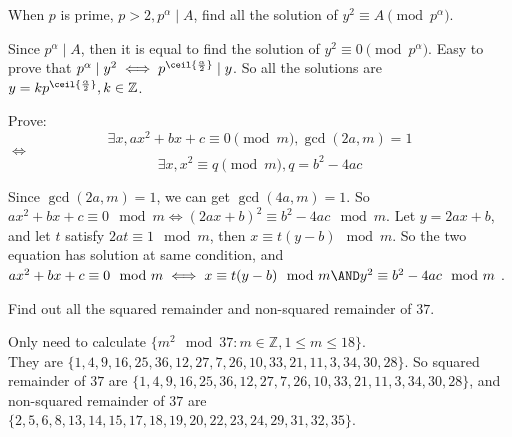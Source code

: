 \documentclass{ctexart}
\newif\ifpreface
\begin{document}
\large
\setlength{\baselineskip}{1.2em}
\ifpreface

\else
{}

\begin{problem}\label{pro:1}
  When \(p\) is prime, \(p > 2,  p^\alpha\mid A\), find all the solution of \(y^2 \equiv A \pmod{p^\alpha}\).
\end{problem}
\begin{solution}
  Since \( p^\alpha\mid A\), then it is equal to find the solution of \(y^2 \equiv 0 \pmod{p^\alpha}\).
  Easy to prove that \(p^\alpha \mid y^2 \iff p^{\ceil{\frac{\alpha}{2}}} \mid y\).
  So all the solutions are \(y=k p^{\ceil{\frac{\alpha}{2}}},k \in \mathbb{Z}\).
\end{solution}
\begin{problem}\label{pro:2}
  Prove:
  \[
    \exists x,ax^2 + bx + c \equiv 0 \pmod{m},\gcd(2a,m)=1
  \]
  \(\iff\)
  \[
    \exists x,x^2 \equiv q \pmod{m},q=b^2 -4ac
  \]
\end{problem}
\begin{solution}
  Since \(\gcd(2a,m)=1\), we can get \(\gcd(4a,m)=1\).
  So \(ax^2 +bx +c \equiv 0 \mod m \iff (2ax+b)^2 \equiv b^2 -4ac \mod m\).
  Let \(y=2ax+b\), and let \(t\) satisfy \(2at \equiv 1 \mod m\), then \(x \equiv t(y-b)\mod m\).
  So the two equation has solution at same condition, and \(ax^2 +bx+c \equiv 0 \mod m \iff x \equiv t(y-b) \mod m \AND y^2 \equiv b^2 -4ac \mod m\) .
\end{solution}

\begin{problem}\label{pro:3}
  Find out all the squared remainder and non-squared remainder of \(37\).
\end{problem}
\begin{solution}
  Only need to calculate \(\{m^2 \mod 37:m \in \mathbb{Z},1 \leq m \leq 18\}\).\\
  They are \(\{1,4,9,16,25,36,12,27,7,26,10,33,21,11,3,34,30,28\}\).
  So squared remainder of \(37\) are \(\{1,4,9,16,25,36,12,27,7,26,10,33,21,11,3,34,30,28\}\), and
  non-squared remainder of \(37\) are \(\{2,5,6,8,13,14,15,17,18,19,20,22,23,24,29,31,32,35\}\).
\end{solution}
\end{document}
